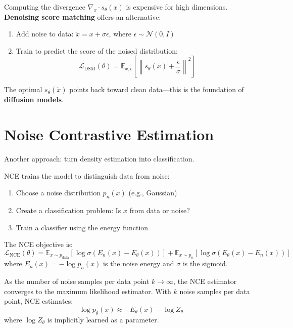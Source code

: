 \begin{remark}
    Computing the divergence $\nabla_x \cdot s_\theta(x)$ is expensive for high dimensions. \textbf{Denoising score matching} offers an alternative:
    \begin{enumerate}
        \item Add noise to data: $\tilde{x} = x + \sigma \epsilon$, where $\epsilon \sim \mathcal{N}(0, I)$
        \item Train to predict the score of the noised distribution:
        \[
            \mathcal{L}_{\text{DSM}}(\theta) = \mathbb{E}_{x, \epsilon}\left[ \left\| s_\theta(\tilde{x}) + \frac{\epsilon}{\sigma} \right\|^2 \right]
        \]
    \end{enumerate}
    The optimal $s_\theta(\tilde{x})$ points back toward clean data---this is the foundation of \textbf{diffusion models}.
\end{remark}

\section{Noise Contrastive Estimation}

Another approach: turn density estimation into classification.

\begin{definition}
    NCE trains the model to distinguish data from noise:
    \begin{enumerate}
        \item Choose a noise distribution $p_n(x)$ (e.g., Gaussian)
        \item Create a classification problem: Is $x$ from data or noise?
        \item Train a classifier using the energy function
    \end{enumerate}

    The NCE objective is:
    \[
        \mathcal{L}_{\text{NCE}}(\theta) = \mathbb{E}_{x \sim p_{\text{data}}}[\log \sigma(E_n(x) - E_\theta(x))] + \mathbb{E}_{x \sim p_n}[\log \sigma(E_\theta(x) - E_n(x))]
    \]
    where $E_n(x) = -\log p_n(x)$ is the noise energy and $\sigma$ is the sigmoid.
\end{definition}

\begin{theorem}
    As the number of noise samples per data point $k \to \infty$, the NCE estimator converges to the maximum likelihood estimator. With $k$ noise samples per data point, NCE estimates:
    \[
        \log p_\theta(x) \approx -E_\theta(x) - \log Z_\theta
    \]
    where $\log Z_\theta$ is implicitly learned as a parameter.
\end{theorem}


